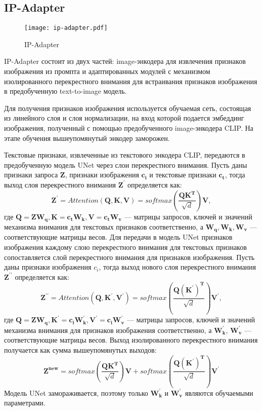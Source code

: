 \documentclass{article}
\begin{document}
\subsection{IP-Adapter}

\begin{figure}[H]
    \centering
    \texttt{[image: ip-adapter.pdf]}
    \caption{IP-Adapter}
    \label{fig:simple}
\end{figure}

IP-Adapter состоит из двух частей: image-энкодера для извлечения признаков изображения из промпта и адаптированных модулей с механизмом изолированного перекрестного внимания для встраивания признаков изображения в предобученную text-to-image модель.

Для получения признаков изображения используется обучаемая сеть, состоящая из линейного слоя и слоя нормализации, на вход которой подается эмбеддинг изображения, полученный с помощью предобученного image-энкодера CLIP. На этапе обучения вышеупомянутый энкодер заморожен.

Текстовые признаки, извлеченные из текстового энкодера CLIP, передаются в предобученную модель UNet через слои перекрестного внимания. Пусть даны признаки запроса $\mathbf{Z}$, признаки изображения $\mathbf{c_i}$ и текстовые признаки $\mathbf{c_t}$, тогда выход слоя перекрестного внимания $\mathbf{Z^{\prime}}$ определяется как: 
\begin{equation}
\mathbf{Z^{\prime}} = Attention(\mathbf{Q}, \mathbf{K}, \mathbf{V}) = softmax(\frac{\mathbf{QK^T}}{\sqrt{d}})\mathbf{V},
\end{equation}
где $\mathbf{Q} = \mathbf{ZW_q}, \mathbf{K} = \mathbf{c_t W_k}, \mathbf{V} = \mathbf{c_t W_v}$ --- матрицы запросов, ключей и значений механизма внимания для текстовых признаков соответственно, а $\mathbf{W_q, W_k, W_v}$ --- соответствующие матрицы весов. Для передачи в модель UNet признаков изображения каждому слою перекрестного внимания для текстовых признаков сопоставляется слой перекрестного внимания для признаков изображения. Пусть даны признаки изображения $c_i$, тогда выход нового слоя перекрестного внимания $\mathbf{Z^{\prime\prime}}$ определяется как: 
\begin{equation}
\mathbf{Z^{\prime\prime}} = Attention(\mathbf{Q, K^{\prime}, V^{\prime}}) = softmax(\frac{\mathbf{Q(K^{\prime})^T}}{\sqrt{d}})\mathbf{V^{\prime}},
\end{equation}
где $\mathbf{Q = Z W_q, K^{\prime} = c_i {W}^{\prime}_k, V^{\prime} = c_i {W}^{\prime}_v}$ --- матрицы запросов, ключей и значений механизма внимания для признаков изображения соответственно, а $\mathbf{{W}^{\prime}_k}$, $\mathbf{{W}^{\prime}_v}$ --- соответствующие матрицы весов. Выход изолированного перекрестного внимания получается как сумма вышеупомянутых выходов: 
\begin{equation}
\mathbf{Z^{new}} = softmax(\frac{\mathbf{QK^T}}{\sqrt{d}})\mathbf{V} +  softmax(\frac{\mathbf{Q(K^{\prime})^T}}{\sqrt{d}})\mathbf{V^{\prime}}
\end{equation}
Модель UNet замораживается, поэтому только $\mathbf{{W}^{\prime}_k}$ и $\mathbf{{W}^{\prime}_v}$ являются обучаемыми параметрами.
\end{document}

